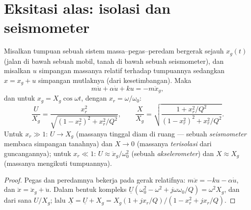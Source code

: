 \section{Eksitasi alas: isolasi dan seismometer}

\begin{proposition}\label{prop:b1:oscillators-resonance:base}
Misalkan tumpuan sebuah sistem massa--pegas--peredam bergerak sejauh
$x_g(t)$ (jalan di bawah sebuah mobil, tanah di bawah sebuah
seismometer), dan misalkan $u$ simpangan massanya relatif terhadap
tumpuannya sedangkan $x = x_g + u$ simpangan mutlaknya (dari
kesetimbangan). Maka
\[
m\ddot u + \alpha\dot u + ku = -m\ddot x_g ,
\]
dan untuk $x_g = X_g\cos\omega t$, dengan $x_r = \omega/\omega_0$:
\[
\frac{U}{X_g} = \frac{x_r^2}{\sqrt{(1 - x_r^2)^2 + x_r^2/Q^2}},
\qquad
\frac{X}{X_g} = \sqrt{\frac{1 + x_r^2/Q^2}{(1 - x_r^2)^2 + x_r^2/Q^2}} .
\]
Untuk $x_r \gg 1$: $U \to X_g$ (massanya tinggal diam di ruang ---
sebuah \emph{seismometer} membaca simpangan tanahnya) dan $X \to 0$
(massanya \emph{terisolasi} dari guncangannya); untuk $x_r \ll 1$:
$U \approx
\ddot x_g/\omega_0^2$ (sebuah \emph{akselerometer}) dan $X \approx X_g$
(massanya mengikuti tumpuannya).
\end{proposition}

\begin{proof}
Pegas dan peredamnya bekerja pada gerak relatifnya: $m\ddot x = -ku -
\alpha\dot u$, dan $\ddot x = \ddot x_g + \ddot u$. Dalam bentuk kompleks
$\underline U(\omega_0^2 - \omega^2 + j\omega\omega_0/Q) = \omega^2X_g$, dan dari
sana $U/X_g$; lalu $\underline X = \underline U + X_g = X_g(1 + jx_r/Q)/(1 -
x_r^2 + jx_r/Q)$.
\end{proof}

